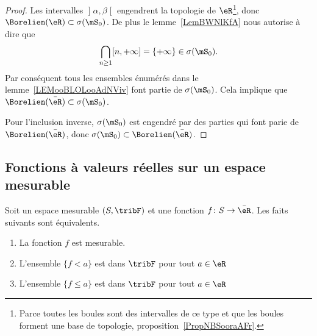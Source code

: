 \begin{proof}
Les intervalles \( \mathopen] \alpha , \beta \mathclose[\) engendrent la topologie de \( \eR\)\footnote{Parce toutes les boules sont des intervalles de ce type et que les boules forment une base de topologie, proposition~\ref{PropNBSooraAFr}.}, donc \( \Borelien(\eR)\subset\sigma(\mS_0)\). De plus le lemme~\ref{LemBWNlKfA} nous autorise à dire que
    \begin{equation}
        \bigcap_{n\geq 1}\mathopen[ n , +\infty \mathclose]=\{ +\infty \}\in\sigma(\mS_0).
    \end{equation}
    Par conséquent tous les ensembles énumérés dans le lemme~\ref{LEMooBLOLooAdNViv} font partie de \( \sigma(\mS_0)\). Cela implique que \( \Borelien(\bar\eR)\subset\sigma(\mS_0)\).

    Pour l'inclusion inverse, \( \sigma(\mS_0)\) est engendré par des parties qui font parie de \( \Borelien(\bar \eR)\), donc \( \sigma(\mS_0)\subset\Borelien(\bar \eR)\).
\end{proof}

\subsection{Fonctions à valeurs réelles sur un espace mesurable}

\begin{theorem}     \label{THOooWHFLooKYGsOm}
    Soit un espace mesurable \( (S,\tribF)\) et une fonction \( f\colon S\to \bar \eR\). Les faits suivants sont équivalents.
    \begin{enumerate}
        \item\label{ITEMooHAMHooYLqUhVi}
            La fonction \( f\) est mesurable.
        \item\label{ITEMooHAMHooYLqUhVii}
            L'ensemble \( \{ f<a \}\) est dans \( \tribF\) pour tout \( a\in \eR\)
        \item\label{ITEMooHAMHooYLqUhViii}
            L'ensemble \( \{ f\leq a \}\) est dans \( \tribF\) pour tout \( a\in \eR\)
    \end{enumerate}
\end{theorem}

